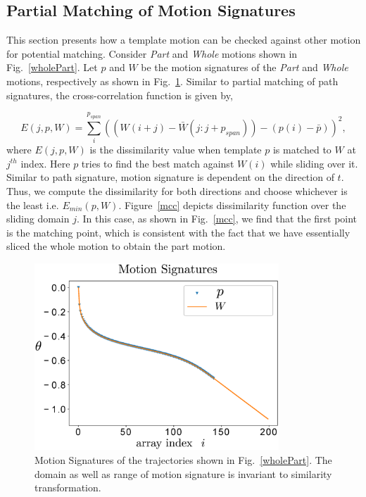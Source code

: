 \documentclass[twocolumn,10pt]{asme2ej}
\begin{document}
\subsection{Partial Matching of Motion Signatures}\label{sec_mcc}
This section presents how a template motion can be checked against other motion for potential matching.
Consider \emph{Part} and \emph{Whole} motions shown in Fig.~\ref{wholePart}.
Let $p$ and $W$ be the motion signatures of the \emph{Part} and \emph{Whole} motions, respectively as shown in Fig.~\ref{motionSignature}.
Similar to partial matching of path signatures, the cross-correlation function is given by,

\begin{equation}\label{mccEq}
  E(j, p, W) = \sum_{i}^{p_{span}} {((W(i+j) - \bar{W}(j: j + p_{span})) - (p(i) - \bar{p}))}^2,
\end{equation}
where $E(j, p, W)$ is the dissimilarity value when template $p$ is matched to $W$ at $j^{th}$ index. Here $p$ tries to find the best match against $W(i)$ while sliding over it.
Similar to path signature, motion signature is dependent on the direction of $t$. Thus, we compute the dissimilarity for both directions and choose whichever is the least i.e. $E_{min}(p, W)$.
Figure~\ref{mcc} depicts dissimilarity function over the sliding domain $j$.
In this case, as shown in Fig.~\ref{mcc}, we find that the first point is the matching point, which is consistent with the fact that we have essentially sliced the whole motion to obtain the part motion.

\begin{figure}
\centering
\includegraphics[width=260pt]{figure/fig_motion_signatures.eps}
  \caption{Motion Signatures of the trajectories shown in Fig.~\ref{wholePart}. The domain as well as range of motion signature is invariant to similarity transformation.}
\label{motionSignature}
\end{figure}
\end{document}
